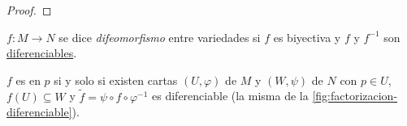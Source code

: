 \documentclass[../VD.tex]{subfiles}
\begin{document}
\begin{proof}
\end{proof}

\begin{definition}[difeomorfismo]
  \label{def:difeomorfismo}
  \(f \colon M \to N\) se dice \emph{difeomorfismo} entre variedades si \(f\) es
  biyectiva y \(f\) y \(f^{-1}\) son \hyperref[def:diferenciable]{diferenciables}.
\end{definition}

\begin{lemma}
  \(f\) es  en \(p\) si y solo si existen cartas
  \((U,\varphi)\) de \(M\) y \((W,\psi)\) de \(N\) con \(p \in U\), \(f(U)
  \subseteq W\) y \(\widetilde{f} = \psi \circ f \circ \varphi^{-1}\) es
  diferenciable (la misma de la \cref{fig:factorizacion-diferenciable}).
\end{lemma}
\end{document}
